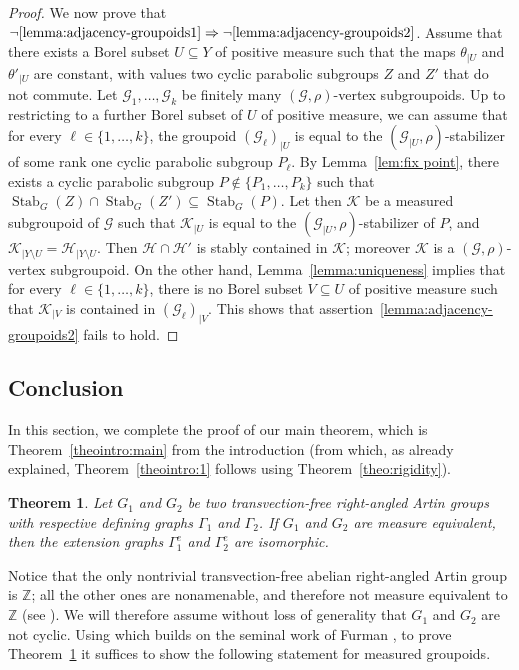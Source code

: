\documentclass[JEP,XML,SOM,Unicode,NoFloatCountersInSection,published]{cedram}
\let\mathcal\mathscr
\theoremstyle{plain}
\newtheorem{theo}{Theorem}[section]
\theoremstyle{definition}
\newcommand{\calg}{\mathcal{G}}
\newcommand{\calh}{\mathcal{H}}
\newcommand{\calk}{\mathcal{K}}
\newcommand{\Stab}{\operatorname{Stab}}
\begin{document}
\begin{proof}
We now prove that $\neg \eqref{lemma:adjacency-groupoids1}\Rightarrow \neg \eqref{lemma:adjacency-groupoids2}$. Assume that there exists a Borel subset $U\subseteq Y$ of positive measure such that the maps $\theta_{|U}$ and $\theta'_{|U}$ are constant, with values two cyclic parabolic subgroups $Z$ and $Z'$ that do not commute. Let $\calg_1,\dots,\calg_k$ be finitely many $(\calg,\rho)$-vertex subgroupoids. Up to restricting to a further Borel subset of $U$ of positive measure, we can assume that for every $\ell\in\{1,\dots,k\}$, the groupoid $(\calg_\ell)_{|U}$ is equal to the $(\calg_{|U},\rho)$-stabilizer of some rank one cyclic parabolic subgroup $P_\ell$. By Lemma~\ref{lem:fix point}, there exists a cyclic parabolic subgroup $P\notin\{P_1,\dots,P_k\}$ such that $\Stab_G(Z)\cap\Stab_G(Z')\subseteq\Stab_G(P)$. Let then $\calk$ be a measured subgroupoid of $\calg$ such that $\calk_{|U}$ is equal to the $(\calg_{|U},\rho)$-stabilizer of $P$, and $\calk_{|Y\setminus U}=\calh_{|Y\setminus U}$. Then $\calh\cap\calh'$ is stably contained in $\calk$; moreover $\calk$ is a $(\calg,\rho)$-vertex subgroupoid. On the other hand, Lemma~\ref{lemma:uniqueness} implies that for every $\ell\in\{1,\dots,k\}$, there is no Borel subset $V\subseteq U$ of positive measure such that $\calk_{|V}$ is contained in $(\calg_\ell)_{|V}$. This shows that assertion~\eqref{lemma:adjacency-groupoids2} fails to hold.
\end{proof}

\subsection{Conclusion}

In this section, we complete the proof of our main theorem, which is Theorem~\ref{theointro:main} from the introduction (from which, as already explained, Theorem~\ref{theointro:1} follows using Theorem~\ref{theo:rigidity}).

\begin{theo}\label{theo:main}
Let $G_1$ and $G_2$ be two transvection-free right-angled Artin groups with respective defining graphs $\Gamma_1$ and $\Gamma_2$. If $G_1$ and $G_2$ are measure equivalent, then the extension graphs $\Gamma_1^e$ and $\Gamma_2^e$ are isomorphic.
\end{theo}

Notice that the only nontrivial transvection-free abelian right-angled Artin group is $\mathbb{Z}$; all the other ones are nonamenable, and therefore not measure equivalent to $\mathbb{Z}$ (see \cite[Cor.\,3.2]{Fur-survey}). We will therefore assume without loss of generality that $G_1$ and $G_2$ are not cyclic. Using \cite[Prop.\,5.11]{HH} which builds on the seminal work of Furman \cite{Fur2}, to prove Theorem~\ref{theo:main} it suffices to show the following statement for measured groupoids.
\end{document}
